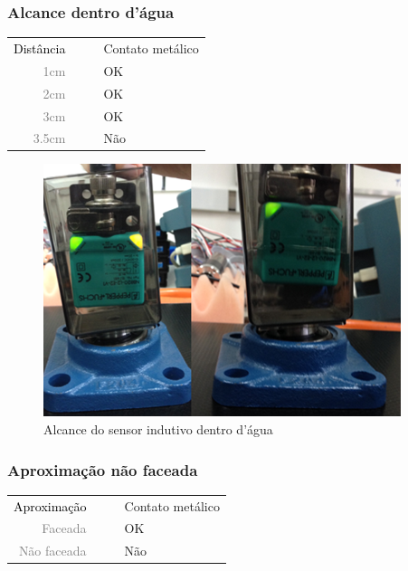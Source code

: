  \subsubsection{Alcance dentro d'água}
 \begin{table}[H]
	\begin{tabular}{r l|l p{12cm} }
		\textcolor{black}{Distância} &&& 	{Contato metálico}\\
		\textcolor{gray}{1cm} &&& 				{OK}\\
		\textcolor{gray}{2cm} &&& 				{OK}\\
		\textcolor{gray}{3cm} &&& 				{OK}\\
		\textcolor{gray}{3.5cm} &&& 				{Não}\\
 	\end{tabular}
\end{table}

\begin{figure}[H]
 \centering
 \includegraphics[width=1\columnwidth]{indutivo/figs/indutivo_agua.png}
 \caption{Alcance do sensor indutivo dentro d'água}
 \label{fig:indu_agu}
 \end{figure}
 
 \subsubsection{Aproximação não faceada}
  \begin{table}[h!]
	\begin{tabular}{r l|l p{12cm} }
		\textcolor{black}{Aproximação} &&& 	{Contato metálico}\\
		\textcolor{gray}{Faceada} &&& 				{OK}\\
		\textcolor{gray}{Não faceada} &&& 				{Não}\\
 	\end{tabular}
\end{table}

